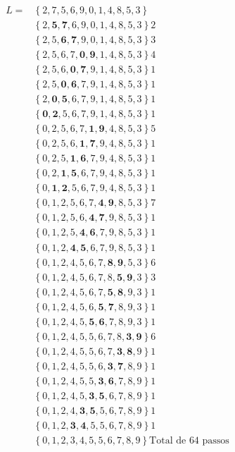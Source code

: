 \documentclass{homework}
\begin{document}
	\begin{multicols}{2}
	\begin{align*}
	L = &\left\{2,7,5,6,9,0,1,4,8,5,3\right\}\\
	&\left\{2,\mathbf{5},\mathbf{7},6,9,0,1,4,8,5,3\right\}2\\
	&\left\{2,5,\mathbf{6},\mathbf{7},9,0,1,4,8,5,3\right\}3\\
	&\left\{2,5,6,7,\mathbf{0},\mathbf{9},1,4,8,5,3\right\}4\\
	&\left\{2,5,6,\mathbf{0},\mathbf{7},9,1,4,8,5,3\right\}1\\
	&\left\{2,5,\mathbf{0},\mathbf{6},7,9,1,4,8,5,3\right\}1\\
	&\left\{2,\mathbf{0},\mathbf{5},6,7,9,1,4,8,5,3\right\}1\\
	&\left\{\mathbf{0},\mathbf{2},5,6,7,9,1,4,8,5,3\right\}1\\
	&\left\{0,2,5,6,7,\mathbf{1},\mathbf{9},4,8,5,3\right\}5\\
	&\left\{0,2,5,6,\mathbf{1},\mathbf{7},9,4,8,5,3\right\}1\\
	&\left\{0,2,5,\mathbf{1},\mathbf{6},7,9,4,8,5,3\right\}1\\
	&\left\{0,2,\mathbf{1},\mathbf{5},6,7,9,4,8,5,3\right\}1\\
	&\left\{0,\mathbf{1},\mathbf{2},5,6,7,9,4,8,5,3\right\}1\\
	&\left\{0,1,2,5,6,7,\mathbf{4},\mathbf{9},8,5,3\right\}7\\
	&\left\{0,1,2,5,6,\mathbf{4},\mathbf{7},9,8,5,3\right\}1\\
	&\left\{0,1,2,5,\mathbf{4},\mathbf{6},7,9,8,5,3\right\}1\\
	&\left\{0,1,2,\mathbf{4},\mathbf{5},6,7,9,8,5,3\right\}1\\
	&\left\{0,1,2,4,5,6,7,\mathbf{8},\mathbf{9},5,3\right\}6\\
	&\left\{0,1,2,4,5,6,7,8,\mathbf{5},\mathbf{9},3\right\}3\\
	&\left\{0,1,2,4,5,6,7,\mathbf{5},\mathbf{8},9,3\right\}1\\
	&\left\{0,1,2,4,5,6,\mathbf{5},\mathbf{7},8,9,3\right\}1\\
	&\left\{0,1,2,4,5,\mathbf{5},\mathbf{6},7,8,9,3\right\}1\\
	&\left\{0,1,2,4,5,5,6,7,8,\mathbf{3},\mathbf{9}\right\}6\\
	&\left\{0,1,2,4,5,5,6,7,\mathbf{3},\mathbf{8},9\right\}1\\
	&\left\{0,1,2,4,5,5,6,\mathbf{3},\mathbf{7},8,9\right\}1\\
	&\left\{0,1,2,4,5,5,\mathbf{3},\mathbf{6},7,8,9\right\}1\\
	&\left\{0,1,2,4,5,\mathbf{3},\mathbf{5},6,7,8,9\right\}1\\
	&\left\{0,1,2,4,\mathbf{3},\mathbf{5},5,6,7,8,9\right\}1\\
	&\left\{0,1,2,\mathbf{3},\mathbf{4},5,5,6,7,8,9\right\}1\\
	&\left\{0,1,2,3,4,5,5,6,7,8,9\right\} \text{Total de  $64$ passos}
	\end{align*}
	\end{multicols}
	
\end{document}
